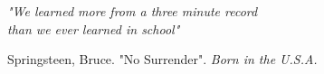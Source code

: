 \begin{dedication}
\textit{"We learned more from a three minute record\\ than we ever learned in school"}

Springsteen, Bruce. "No Surrender". \textit{Born in the U.S.A.}
\newpage
\end{dedication}
